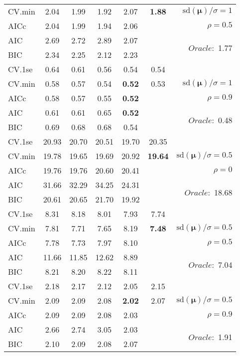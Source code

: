 \begin{table}
\begin{center}
\begin{tabular}{l*{5}{c}|r}
CV.min & 2.04 & 1.99 & 1.92 & 2.07 & {\bf 1.88} &  $\mathrm{sd}(\mathbf{\mu})/\sigma=1$ \\
AICc & 2.04 & 1.99 & 1.94 & 2.06 & & $\rho=0.5$ \\
AIC & 2.69 & 2.72 & 2.89 & 2.07 & &  \multirow{2}{*}{$Oracle: $ 1.77} \\
BIC & 2.34 & 2.25 & 2.12 & 2.23 & &  \\
 \hline 
CV.1se & 0.64 & 0.61 & 0.56 & 0.54 & 0.54 & \\
CV.min & 0.58 & 0.57 & 0.54 & {\bf 0.52} & 0.53 &  $\mathrm{sd}(\mathbf{\mu})/\sigma=1$ \\
AICc & 0.58 & 0.57 & 0.55 & {\bf 0.52} & & $\rho=0.9$ \\
AIC & 0.61 & 0.61 & 0.65 & {\bf 0.52} & &  \multirow{2}{*}{$Oracle: $ 0.48} \\
BIC & 0.69 & 0.68 & 0.68 & 0.54 & &  \\
 \hline 
CV.1se & 20.93 & 20.70 & 20.51 & 19.70 & 20.35 & \\
CV.min & 19.78 & 19.65 & 19.69 & 20.92 & {\bf 19.64} &  $\mathrm{sd}(\mathbf{\mu})/\sigma=0.5$ \\
AICc & 19.76 & 19.76 & 20.60 & 20.41 & & $\rho=0$ \\
AIC & 31.66 & 32.29 & 34.25 & 24.31 & &  \multirow{2}{*}{$Oracle: $ 18.68} \\
BIC & 20.61 & 20.65 & 21.70 & 19.92 & &  \\
 \hline 
CV.1se & 8.31 & 8.18 & 8.01 & 7.93 & 7.74 & \\
CV.min & 7.81 & 7.71 & 7.65 & 8.19 & {\bf 7.48} &  $\mathrm{sd}(\mathbf{\mu})/\sigma=0.5$ \\
AICc & 7.78 & 7.73 & 7.97 & 8.10 & & $\rho=0.5$ \\
AIC & 11.66 & 11.85 & 12.62 & 8.89 & &  \multirow{2}{*}{$Oracle: $ 7.04} \\
BIC & 8.21 & 8.20 & 8.22 & 8.11 & &  \\
 \hline 
CV.1se & 2.18 & 2.17 & 2.12 & 2.05 & 2.15 & \\
CV.min & 2.09 & 2.09 & 2.08 & {\bf 2.02} & 2.07 &  $\mathrm{sd}(\mathbf{\mu})/\sigma=0.5$ \\
AICc & 2.09 & 2.09 & 2.08 & 2.03 & & $\rho=0.9$ \\
AIC & 2.66 & 2.74 & 3.05 & 2.03 & &  \multirow{2}{*}{$Oracle: $ 1.91} \\
BIC & 2.10 & 2.09 & 2.08 & 2.07 & &  \\
 \hline 
\end{tabular}
\end{center}
\vspace{-1cm}
\end{table}





